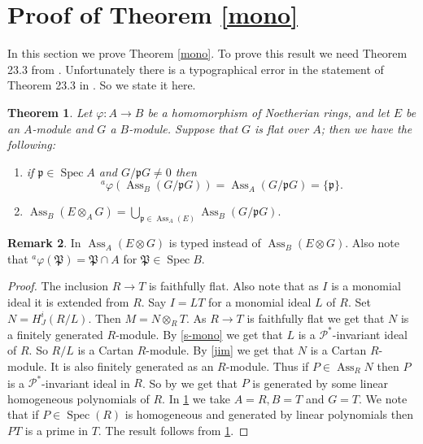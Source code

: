 \documentclass{amsart}
\newcommand{\Pc}{\mathcal{P} }
\newcommand{\rt}{\rightarrow}
\newcommand{\fP}{\mathfrak{P}}
\newcommand{\fp}{\mathfrak{p}}
\newcommand{\Ass}{\operatorname{Ass}}
\newcommand{\Spec}{\operatorname{Spec}}
\theoremstyle{plain}
\newtheorem{theorem}{Theorem}[section]
\theoremstyle{definition}
\newtheorem{remark}[theorem]{Remark}
\theoremstyle{remark}
\begin{document}
\section{Proof of Theorem \ref{mono}}
In this section we prove Theorem \ref{mono}.
To prove this result we need Theorem 23.3 from \cite{Ma}.   Unfortunately  there is a typographical error in the statement of Theorem 23.3 in \cite{Ma}.
So we state it here.
\begin{theorem}\label{23}
Let $\varphi \colon A \rt B$ be a homomorphism of Noetherian rings, and let $E$ be an $A$-module and $G$ a $B$-module. Suppose that
$G$ is flat over $A$; then we have the following:
\begin{enumerate}[\rm (i)]
\item
if $\fp \in \Spec A$ and $G/\fp G \neq 0$ then
\[
 ^a \varphi \left( \Ass_B(G/\fp G)  \right) = \Ass_A (G/\fp G) = \{\fp \}.
\]
\item
$\displaystyle{\Ass_B(E\otimes_A G) = \bigcup_{\fp \in \Ass_A(E) } \Ass_B(G/\fp G).}$
\end{enumerate}
\end{theorem}
\begin{remark}
In  \cite{Ma} $\Ass_A(E\otimes G)$ is typed instead of $\Ass_B(E\otimes G)$. Also note that
$^a \varphi(\fP) = \fP \cap A$ for $\fP \in \Spec B$.
\end{remark}
\begin{proof}
The inclusion $R \rt T$ is faithfully flat. Also note that as $I$ is a monomial ideal it is extended from $R$. Say $I = LT$ for a monomial ideal $L$ of $R$. Set $N = H^i_J(R/L)$. Then $M = N \otimes_R T$. As $R \rt T$ is faithfully flat we get that $N$ is a finitely generated $R$-module. By \ref{s-mono} we get that $L$ is a $\Pc^*$-invariant ideal of $R$. So $R/L$ is a Cartan $R$-module.  By \ref{jim} we get that $N$ is a Cartan $R$-module. It is also finitely generated as an $R$-module. Thus if $P \in \Ass_R N$ then $P$ is a $\Pc^*$-invariant ideal in $R$. So by \cite[11.4.1]{SL} we get that $P$ is generated by some linear homogeneous polynomials of $R$. In \ref{23} we take $A = R, B = T$ and $G = T$. We note that if $P \in \Spec(R)$ is homogeneous and generated by linear polynomials then $PT$ is a prime in $T$. The result follows from \ref{23}.
\end{proof}
\end{document}
